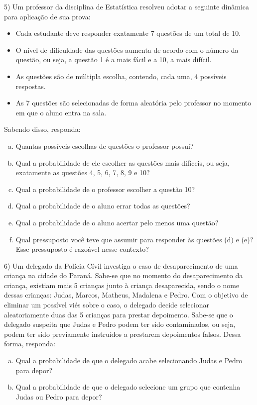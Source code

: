 \documentclass{article}
\begin{document}
5) Um professor da disciplina de Estatística resolveu adotar a seguinte dinâmica para aplicação de sua prova:

\begin{itemize}
    \item Cada estudante deve responder exatamente 7 questões de um total de 10.
    \item O nível de dificuldade das questões aumenta de acordo com o número da questão, ou seja, a questão 1 é a mais fácil e a 10, a mais difícil.
    \item As questões são de múltipla escolha, contendo, cada uma, 4 possíveis respostas.
    \item As 7 questões são selecionadas de forma aleatória pelo professor no momento em que o aluno entra na sala.
\end{itemize}

Sabendo disso, responda:

\begin{enumerate}[a)]
    \item Quantas possíveis escolhas de questões o professor possui?
    \item Qual a probabilidade de ele escolher as questões mais difíceis, ou seja, exatamente as questões 4, 5, 6, 7, 8, 9 e 10?
    \item Qual a probabilidade de o professor escolher a questão 10?
    \item Qual a probabilidade de o aluno errar todas as questões?
    \item Qual a probabilidade de o aluno acertar pelo menos uma questão?
    \item Qual pressuposto você teve que assumir para responder às questões (d) e (e)? Esse pressuposto é razoável nesse contexto?
\end{enumerate}

6) Um delegado da Polícia Cívil investiga o caso de desaparecimento de uma criança na cidade do Paraná. Sabe-se que no momento do desaparecimento da criança, existiam
mais 5 crianças junto à criança desaparecida, sendo o nome dessas crianças: Judas, Marcos, Matheus, Madalena e Pedro. Com o objetivo de eliminar um possível viés sobre o caso, o 
delegado decide selecionar aleatoriamente duas das 5 crianças para prestar depoimento. Sabe-se que o delegado suspeita que Judas e Pedro podem ter sido
contaminados, ou seja, podem ter sido previamente instruídos a prestarem depoimentos falsos. 
Dessa forma, responda: 

\begin{enumerate}[a)]
    \item Qual a probabilidade de que o delegado acabe selecionando Judas e Pedro para depor?
    \item Qual a probabilidade de que o delegado selecione um grupo que contenha Judas ou Pedro para depor?
\end{enumerate}
\end{document}
